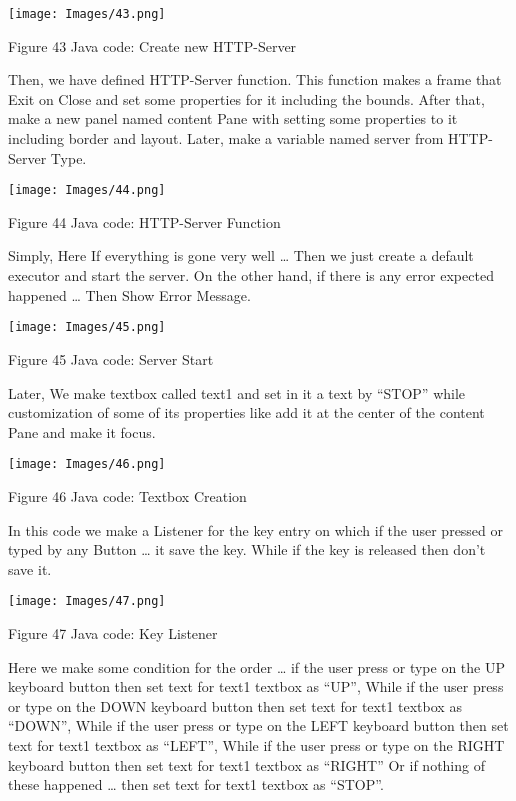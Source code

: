 \documentclass{article}
\begin{document}
\begin{center}
    \texttt{[image: Images/43.png]}
    
    Figure 43 Java code: Create new HTTP-Server
\end{center}

Then, we have defined HTTP-Server function. This function makes a frame that Exit on Close and set some properties for it including the bounds. After that, make a new panel named content Pane with setting some properties to it including border and layout. Later, make a variable named server from HTTP-Server Type.

\begin{center}
    \texttt{[image: Images/44.png]}
    
    Figure 44 Java code: HTTP-Server Function
\end{center}

Simply, Here If everything is gone very well … Then we just create a default executor and start the server. On the other hand, if there is any error expected happened … Then Show Error Message.

\begin{center}
    \texttt{[image: Images/45.png]}
    
    Figure 45 Java code: Server Start
\end{center}

Later, We make textbox called text1 and set in it a text by “STOP” while customization of some of its properties like add it at the center of the content Pane and make it focus.

\begin{center}
    \texttt{[image: Images/46.png]}

    Figure 46 Java code: Textbox Creation    
\end{center}

In this code we make a Listener for the key entry on which if the user pressed or typed by any Button … it save the key. While if the key is released then don’t save it.

\begin{center}
    \texttt{[image: Images/47.png]}

    Figure 47 Java code: Key Listener
\end{center}

Here we make some condition for the order … if the user press or type on the UP keyboard button then set text for text1 textbox as “UP”, While if the user press or type on the DOWN keyboard button then set text for text1 textbox as “DOWN”, While if the user press or type on the LEFT keyboard button then set text for text1 textbox as “LEFT”, While if the user press or type on the RIGHT keyboard button then set text for text1 textbox as “RIGHT” Or if nothing of these happened … then set text for text1 textbox as “STOP”.
\end{document}
